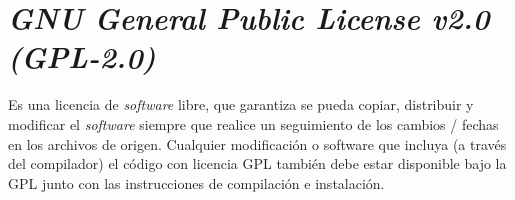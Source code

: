 \section{\textit{GNU General Public License v2.0 (GPL-2.0) }}

	Es una licencia de \textit{software} libre, que garantiza se pueda copiar, distribuir y modificar el \textit{software} siempre que realice un seguimiento de los cambios / fechas en los archivos de origen. Cualquier modificación o software que incluya (a trav\'es del compilador) el código con licencia GPL también debe estar disponible bajo la GPL junto con las instrucciones de compilación e instalación.